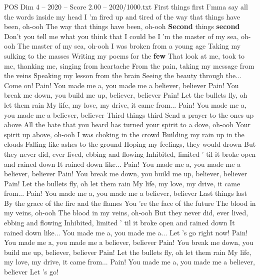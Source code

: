 \begin{textsample}{POS Dim 4 – 2020 – Score 2.00 – 2020/1000.txt}  \label{ex:f4_pos_027}
First things first I'mma say all the words inside my head I 'm fired up and tired of the way that things have been, oh-ooh The way that things have been, oh-ooh \textbf{Second} things \textbf{second} Don't you tell me what you think that I could be I 'm the master of my sea, oh-ooh The master of my sea, oh-ooh I was broken from a young age Taking my sulking to the masses Writing my poems for the \textbf{few} That look at me, took to me, thanking me, singing from heartache From the pain, taking my message from the veins Speaking my lesson from the brain Seeing the beauty through the...
Come on!
Pain!
You made me a, you made me a believer, believer Pain!
You break me down, you build me up, believer, believer Pain!
Let the bullets fly, oh let them rain My life, my love, my drive, it came from...
Pain!
You made me a, you made me a believer, believer Third things third Send a prayer to the ones up above All the hate that you heard has turned your spirit to a dove, oh-ooh Your spirit up above, oh-ooh I was choking in the crowd Building my rain up in the clouds Falling like ashes to the ground Hoping my feelings, they would drown But they never did, ever lived, ebbing and flowing Inhibited, limited ' til it broke open and rained down It rained down like...
Pain!
You made me a, you made me a believer, believer Pain!
You break me down, you build me up, believer, believer Pain!
Let the bullets fly, oh let them rain My life, my love, my drive, it came from...
Pain!
You made me a, you made me a believer, believer Last things last By the grace of the fire and the flames You 're the face of the future The blood in my veins, oh-ooh The blood in my veins, oh-ooh But they never did, ever lived, ebbing and flowing Inhibited, limited ' til it broke open and rained down It rained down like...
You made me a, you made me a...
Let 's go right now!
Pain!
You made me a, you made me a believer, believer Pain!
You break me down, you build me up, believer, believer Pain!
Let the bullets fly, oh let them rain My life, my love, my drive, it came from...
Pain!
You made me a, you made me a believer, believer Let 's go!

\end{textsample}
